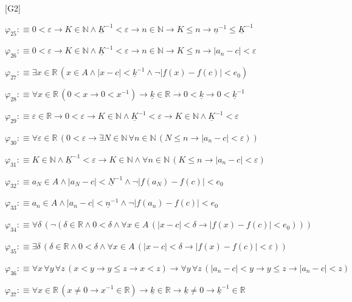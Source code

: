 \begin{fullproof}{[G2]}
\begin{abbrevlist}
\item $\varphi_{25} :\equiv 0 < \varepsilon \to K \in \mathbb{N} \land \underline{K}^{-1} < \varepsilon \to n \in \mathbb{N} \to K \leq n \to \underline{n}^{-1} \leq \underline{K}^{-1}$
\item $\varphi_{26} :\equiv 0 < \varepsilon \to K \in \mathbb{N} \land \underline{K}^{-1} < \varepsilon \to n \in \mathbb{N} \to K \leq n \to \lvert a_{n} - c \rvert < \varepsilon$
\item $\varphi_{27} :\equiv \exists x \in \mathbb{R}\,(x \in A \land \lvert x - c \rvert < \underline{k}^{-1} \land \neg \lvert f(x) - f(c) \rvert < e_{0})$
\item $\varphi_{28} :\equiv \forall x \in \mathbb{R}\,(0 < x \to 0 < x^{-1}) \to \underline{k} \in \mathbb{R} \to 0 < \underline{k} \to 0 < \underline{k}^{-1}$
\item $\varphi_{29} :\equiv \varepsilon \in \mathbb{R} \to 0 < \varepsilon \to K \in \mathbb{N} \land \underline{K}^{-1} < \varepsilon \to K \in \mathbb{N} \land \underline{K}^{-1} < \varepsilon$
\item $\varphi_{30} :\equiv \forall \varepsilon \in \mathbb{R}\,(0 < \varepsilon \to \exists N \in \mathbb{N}\,\forall n \in \mathbb{N}\,(N \leq n \to \lvert a_{n} - c \rvert < \varepsilon))$
\item $\varphi_{31} :\equiv K \in \mathbb{N} \land \underline{K}^{-1} < \varepsilon \to K \in \mathbb{N} \land \forall n \in \mathbb{N}\,(K \leq n \to \lvert a_{n} - c \rvert < \varepsilon)$
\item $\varphi_{32} :\equiv a_{N} \in A \land \lvert a_{N} - c \rvert < \underline{N}^{-1} \land \neg \lvert f(a_{N}) - f(c) \rvert < e_{0}$
\item $\varphi_{33} :\equiv a_{n} \in A \land \lvert a_{n} - c \rvert < \underline{n}^{-1} \land \neg \lvert f(a_{n}) - f(c) \rvert < e_{0}$
\item $\varphi_{34} :\equiv \forall \delta\,(\neg (\delta \in \mathbb{R} \land 0 < \delta \land \forall x \in A\,(\lvert x - c \rvert < \delta \to \lvert f(x) - f(c) \rvert < e_{0})))$
\item $\varphi_{35} :\equiv \exists \delta\,(\delta \in \mathbb{R} \land 0 < \delta \land \forall x \in A\,(\lvert x - c \rvert < \delta \to \lvert f(x) - f(c) \rvert < \varepsilon))$
\item $\varphi_{36} :\equiv \forall x\,\forall y\,\forall z\,(x < y \to y \leq z \to x < z) \to \forall y\,\forall z\,(\lvert a_{n} - c \rvert < y \to y \leq z \to \lvert a_{n} - c \rvert < z)$
\item $\varphi_{37} :\equiv \forall x \in \mathbb{R}\,(x \neq 0 \to x^{-1} \in \mathbb{R}) \to \underline{k} \in \mathbb{R} \to \underline{k} \neq 0 \to \underline{k}^{-1} \in \mathbb{R}$

\end{abbrevlist}
\end{fullproof}

